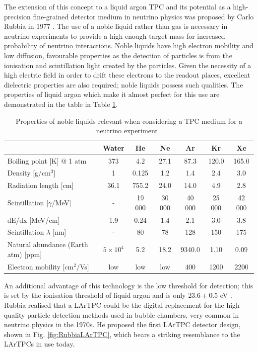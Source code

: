 The extension of this concept to a liquid argon TPC and its potential as a high-precision fine-grained detector medium in neutrino physics was proposed by Carlo Rubbia in 1977 \cite{Rubbia1977}.  The use of a noble liquid rather than gas is necessary in neutrino experiments to provide a high enough target mass for increased probability of neutrino interactions.  Noble liquids have high electron mobility and low diffusion, favourable properties as the detection of particles is from the ionisation and scintillation light created by the particles.  Given the necessity of a high electric field in order to drift these electrons to the readout places, excellent dielectric properties are also required; noble liquids possess such qualities.  The properties of liquid argon which make it almost perfect for this use are demonstrated in the table in Table \ref{tab:NobleProperties}.

\begin{table}
  \caption{Properties of noble liquids relevant when considering a TPC medium for a neutrino experiment \cite{Soderberg2008}.}
  \label{tab:NobleProperties}
  \centering
  \begin{tabular}{ l c c c c c c }
    \toprule
     & Water & He & Ne & \color{red} Ar & Kr & Xe \\
    \midrule
    Boiling point [K] @ 1 atm & 373 & 4.2 & 27.1 & \color{red} 87.3 & 120.0 & 165.0 \\
    Density [g/cm$^3$] & 1 & 0.125 & 1.2 & \color{red} 1.4 & 2.4 & 3.0 \\
    Radiation length [cm] & 36.1 & 755.2 & 24.0 & \color{red} 14.0 & 4.9 & 2.8 \\
    Scintillation [$\gamma$/MeV] & - & 19 000 & 30 000 & \color{red} 40 000 & 25 000 & 42 000 \\
    dE/dx [MeV/cm] & 1.9 & 0.24 & 1.4 & \color{red} 2.1 & 3.0 & 3.8 \\
    Scintillation $\lambda$ [nm] & - & 80 & 78 & \color{red} 128 & 150 & 175 \\
    Natural abundance (Earth atm) [ppm] & $5\times 10^4$ & 5.2 & 18.2 & \color{red} 9340.0 & 1.10 & 0.09 \\
    Electron mobility [cm$^2$/Vs] & low & low & low & \color{red} 400 & 1200 & 2200 \\
    \bottomrule
  \end{tabular}
\end{table}

An additional advantage of this technology is the low threshold for detection; this is set by the ionisation threshold of liquid argon and is only $23.6 \pm 0.5$ eV \cite{Chepel2013}.  Rubbia realised that a LArTPC could be the digital replacement for the high quality particle detection methods used in bubble chambers, very common in neutrino physics in the 1970s.  He proposed the first LArTPC detector design, shown in Fig. \ref{fig:RubbiaLArTPC}, which bears a striking resemblance to the LArTPCs in use today.

